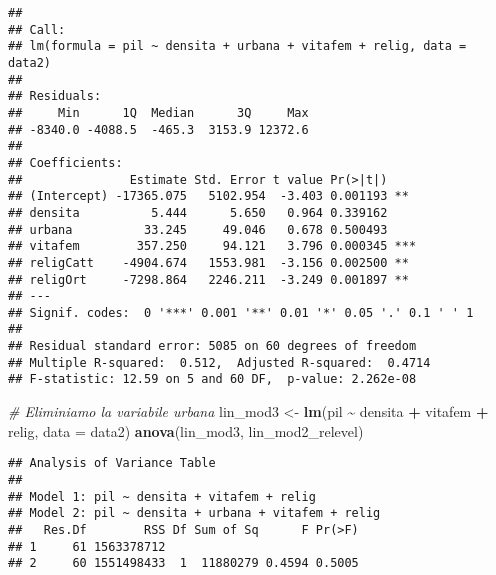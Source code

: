 \documentclass[
]{article}
\newenvironment{Shaded}{\begin{snugshade}}{\end{snugshade}}
\newcommand{\AttributeTok}[1]{\textcolor[rgb]{0.13,0.29,0.53}{#1}}
\newcommand{\CommentTok}[1]{\textcolor[rgb]{0.56,0.35,0.01}{\textit{#1}}}
\newcommand{\FunctionTok}[1]{\textcolor[rgb]{0.13,0.29,0.53}{\textbf{#1}}}
\newcommand{\NormalTok}[1]{#1}
\newcommand{\OtherTok}[1]{\textcolor[rgb]{0.56,0.35,0.01}{#1}}
\newcommand{\SpecialCharTok}[1]{\textcolor[rgb]{0.81,0.36,0.00}{\textbf{#1}}}
\newcommand{\StringTok}[1]{\textcolor[rgb]{0.31,0.60,0.02}{#1}}
\begin{document}
\begin{Shaded}
\end{Shaded}

\begin{verbatim}
## 
## Call:
## lm(formula = pil ~ densita + urbana + vitafem + relig, data = data2)
## 
## Residuals:
##     Min      1Q  Median      3Q     Max 
## -8340.0 -4088.5  -465.3  3153.9 12372.6 
## 
## Coefficients:
##               Estimate Std. Error t value Pr(>|t|)    
## (Intercept) -17365.075   5102.954  -3.403 0.001193 ** 
## densita          5.444      5.650   0.964 0.339162    
## urbana          33.245     49.046   0.678 0.500493    
## vitafem        357.250     94.121   3.796 0.000345 ***
## religCatt    -4904.674   1553.981  -3.156 0.002500 ** 
## religOrt     -7298.864   2246.211  -3.249 0.001897 ** 
## ---
## Signif. codes:  0 '***' 0.001 '**' 0.01 '*' 0.05 '.' 0.1 ' ' 1
## 
## Residual standard error: 5085 on 60 degrees of freedom
## Multiple R-squared:  0.512,  Adjusted R-squared:  0.4714 
## F-statistic: 12.59 on 5 and 60 DF,  p-value: 2.262e-08
\end{verbatim}

\begin{Shaded}
\begin{Highlighting}[]
\CommentTok{\# Eliminiamo la variabile urbana}
\NormalTok{lin\_mod3 }\OtherTok{\textless{}{-}} \FunctionTok{lm}\NormalTok{(pil }\SpecialCharTok{\textasciitilde{}}\NormalTok{ densita }\SpecialCharTok{+}\NormalTok{ vitafem }\SpecialCharTok{+}\NormalTok{ relig, }\AttributeTok{data =}\NormalTok{ data2)}
\FunctionTok{anova}\NormalTok{(lin\_mod3, lin\_mod2\_relevel)}
\end{Highlighting}
\end{Shaded}

\begin{verbatim}
## Analysis of Variance Table
## 
## Model 1: pil ~ densita + vitafem + relig
## Model 2: pil ~ densita + urbana + vitafem + relig
##   Res.Df        RSS Df Sum of Sq      F Pr(>F)
## 1     61 1563378712                           
## 2     60 1551498433  1  11880279 0.4594 0.5005
\end{verbatim}
\end{document}

